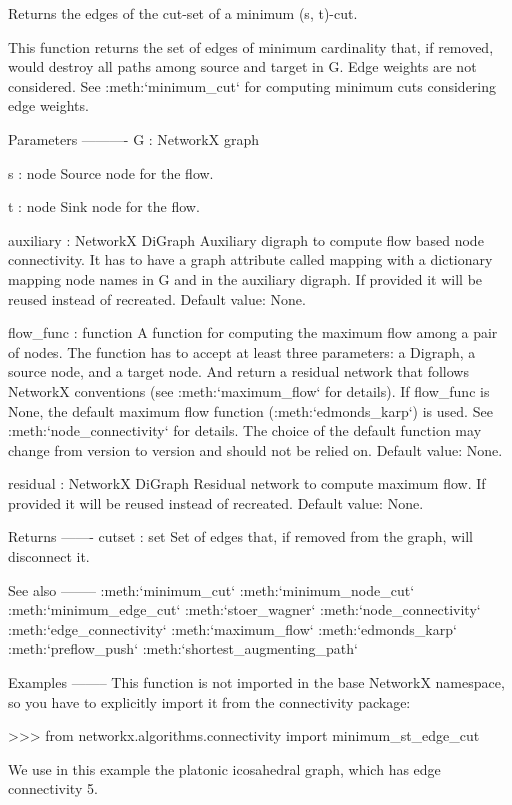 \begin{DoxyVerb}Returns the edges of the cut-set of a minimum (s, t)-cut.

This function returns the set of edges of minimum cardinality that,
if removed, would destroy all paths among source and target in G.
Edge weights are not considered. See :meth:`minimum_cut` for
computing minimum cuts considering edge weights.

Parameters
----------
G : NetworkX graph

s : node
    Source node for the flow.

t : node
    Sink node for the flow.

auxiliary : NetworkX DiGraph
    Auxiliary digraph to compute flow based node connectivity. It has
    to have a graph attribute called mapping with a dictionary mapping
    node names in G and in the auxiliary digraph. If provided
    it will be reused instead of recreated. Default value: None.

flow_func : function
    A function for computing the maximum flow among a pair of nodes.
    The function has to accept at least three parameters: a Digraph,
    a source node, and a target node. And return a residual network
    that follows NetworkX conventions (see :meth:`maximum_flow` for
    details). If flow_func is None, the default maximum flow function
    (:meth:`edmonds_karp`) is used. See :meth:`node_connectivity` for
    details. The choice of the default function may change from version
    to version and should not be relied on. Default value: None.

residual : NetworkX DiGraph
    Residual network to compute maximum flow. If provided it will be
    reused instead of recreated. Default value: None.

Returns
-------
cutset : set
    Set of edges that, if removed from the graph, will disconnect it.

See also
--------
:meth:`minimum_cut`
:meth:`minimum_node_cut`
:meth:`minimum_edge_cut`
:meth:`stoer_wagner`
:meth:`node_connectivity`
:meth:`edge_connectivity`
:meth:`maximum_flow`
:meth:`edmonds_karp`
:meth:`preflow_push`
:meth:`shortest_augmenting_path`

Examples
--------
This function is not imported in the base NetworkX namespace, so you
have to explicitly import it from the connectivity package:

>>> from networkx.algorithms.connectivity import minimum_st_edge_cut

We use in this example the platonic icosahedral graph, which has edge
connectivity 5.


\end{DoxyVerb}
